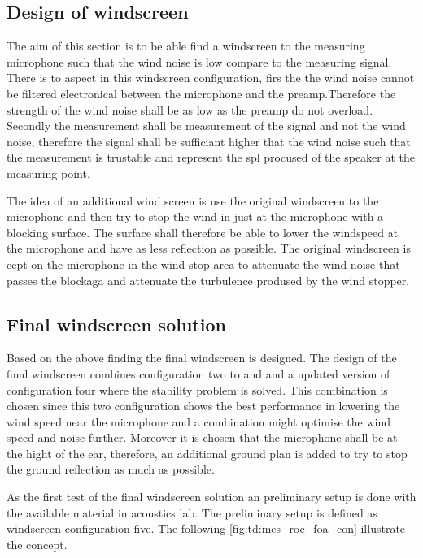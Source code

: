 \subsection{Design of windscreen}
The aim of this section is to be able find a windscreen to the measuring microphone such that the wind noise is low compare to the measuring signal. There is to aspect in this windscreen configuration, firs the the wind noise cannot be filtered electronical between the microphone and the preamp.Therefore the strength of the wind noise shall be as low as the preamp do not overload. Secondly the measurement shall be measurement of the signal and not the wind noise, therefore the signal shall be sufficiant higher that the wind noise such that the measurement is trustable and represent the \gls{spl} procused of the speaker at the measuring point. 

The idea of an additional wind screen is use the original windscreen to the microphone and then try to stop the wind in just at the microphone with a blocking surface. The surface shall therefore be able to lower the windspeed at the microphone and have as less reflection as possible. The original windscreen is cept on the microphone in the wind stop area to attenuate the wind noise that passes the blockaga and attenuate the turbulence prodused by the wind stopper. 

    
    


\subsection{Final windscreen solution}
Based on the above finding the final windscreen is designed. The design of the final windscreen combines configuration two to and and a updated version of configuration four where the stability problem is solved. This combination is chosen since this two configuration shows the best performance in lowering the wind speed near the microphone and a combination might optimise the wind speed and noise further. Moreover it is chosen that the microphone shall be at the hight of the ear, therefore, an additional ground plan is added to try to stop the ground reflection as much as possible. 

As the first test of the final windscreen solution an preliminary setup is done with the available material in acoustics lab. The preliminary setup is defined as windscreen configuration five. The following \autoref{fig:td:mes_roc_foa_con} illustrate the concept.

